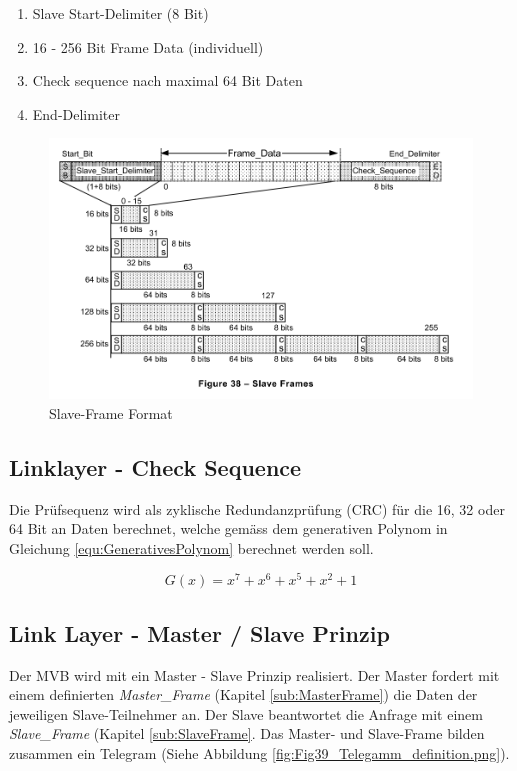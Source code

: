 \begin{enumerate}
    \item Slave Start-Delimiter (8 Bit)
    \item 16 - 256 Bit Frame Data (individuell)
    \item Check sequence nach maximal 64 Bit Daten 
    \item End-Delimiter
\end{enumerate}

\begin{figure}[H]
    \centering
    \includegraphics[width = 0.8 \textwidth]{Figures/Chap2/Grundlagen/MVB_DOKU/Frames und Telegramme/Fig38_SlaveFrameFormat.png}
    \caption{Slave-Frame Format}
    \label{fig:SlaveFrameFormat}
\end{figure}

\subsection{Linklayer - Check Sequence}
\label{sub:CheckSequenz}
Die Prüfsequenz wird als zyklische Redundanzprüfung (CRC) für die 16, 32 oder 64 Bit an Daten berechnet, welche gemäss dem generativen Polynom in Gleichung \ref{equ:GenerativesPolynom} berechnet werden soll.

\begin{equation}
    G(x) = x^7 + x^6 + x^5 + x^2 + 1
    \label{equ:GenerativesPolynom}
\end{equation}

\subsection{Link Layer - Master / Slave Prinzip}
\label{sub:MasterSlavePrinzip}
Der MVB wird mit ein Master - Slave Prinzip realisiert. Der Master fordert mit einem definierten \textit{Master\_Frame} (Kapitel \ref{sub:MasterFrame}) die Daten der jeweiligen Slave-Teilnehmer an. Der Slave beantwortet die Anfrage mit einem \textit{Slave\_Frame} (Kapitel \ref{sub:SlaveFrame}. Das Master- und Slave-Frame bilden zusammen ein Telegram (Siehe Abbildung \ref{fig:Fig39_Telegamm_definition.png}). 

